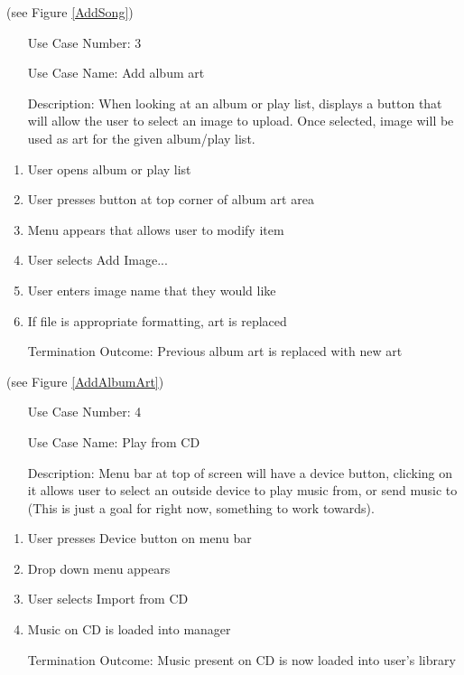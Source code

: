 \documentclass[10pt,conference,onecolumn,compsoc]{IEEEtran}
\begin{document}
(see Figure \ref{AddSong})

\begin{itemize}
\item[Use Case Number:] 3
\item[Use Case Name:] Add album art
\item[Description:] When looking at an album or play list, displays a button that will allow the user to select an image to upload. Once selected, image will be used as art for the given album/play list.
\end{itemize}

\begin{enumerate}
\item User opens album or play list
\item User presses button at top corner of album art area
\item Menu appears that allows user to modify item
\item User selects Add Image...
\item User enters image name that they would like
\item If file is appropriate formatting, art is replaced
\item [Termination Outcome:] Previous album art is replaced with new art
\end{enumerate}

(see Figure \ref{AddAlbumArt})

\begin{itemize}
\item[Use Case Number:] 4
\item[Use Case Name:] Play from CD
\item[Description:] Menu bar at top of screen will have a device button, clicking on it allows user to select an outside device to play music from, or send music to (This is just a goal for right now, something to work towards).
\end{itemize}

\begin{enumerate}
\item User presses Device button on menu bar
\item Drop down menu appears
\item User selects Import from CD
\item Music on CD is loaded into manager
\item [Termination Outcome:] Music present on CD is now loaded into user's library
\end{enumerate}
\end{document}
